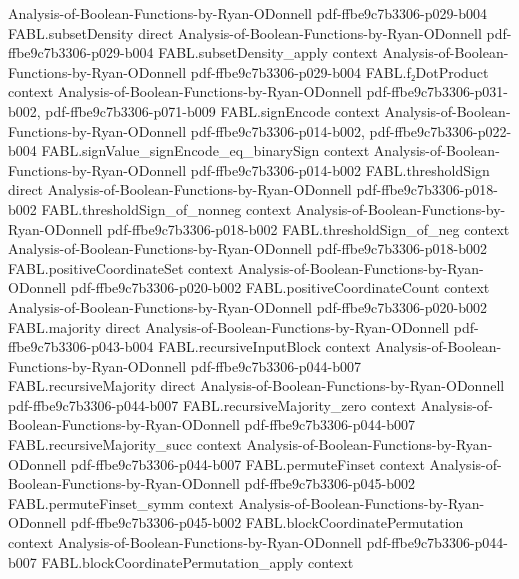 \begin{theorem}
  {Analysis-of-Boolean-Functions-by-Ryan-ODonnell}
  {pdf-ffbe9c7b3306-p029-b004}
\proofstep
  {FABL.subsetDensity}
  {direct}
  {Analysis-of-Boolean-Functions-by-Ryan-ODonnell}
  {pdf-ffbe9c7b3306-p029-b004}
\proofstep
  {FABL.subsetDensity_apply}
  {context}
  {Analysis-of-Boolean-Functions-by-Ryan-ODonnell}
  {pdf-ffbe9c7b3306-p029-b004}
\proofstep
  {FABL.f₂DotProduct}
  {context}
  {Analysis-of-Boolean-Functions-by-Ryan-ODonnell}
  {pdf-ffbe9c7b3306-p031-b002,
    pdf-ffbe9c7b3306-p071-b009}
\proofstep
  {FABL.signEncode}
  {context}
  {Analysis-of-Boolean-Functions-by-Ryan-ODonnell}
  {pdf-ffbe9c7b3306-p014-b002,
    pdf-ffbe9c7b3306-p022-b004}
\proofstep
  {FABL.signValue_signEncode_eq_binarySign}
  {context}
  {Analysis-of-Boolean-Functions-by-Ryan-ODonnell}
  {pdf-ffbe9c7b3306-p014-b002}
\proofstep
  {FABL.thresholdSign}
  {direct}
  {Analysis-of-Boolean-Functions-by-Ryan-ODonnell}
  {pdf-ffbe9c7b3306-p018-b002}
\proofstep
  {FABL.thresholdSign_of_nonneg}
  {context}
  {Analysis-of-Boolean-Functions-by-Ryan-ODonnell}
  {pdf-ffbe9c7b3306-p018-b002}
\proofstep
  {FABL.thresholdSign_of_neg}
  {context}
  {Analysis-of-Boolean-Functions-by-Ryan-ODonnell}
  {pdf-ffbe9c7b3306-p018-b002}
\proofstep
  {FABL.positiveCoordinateSet}
  {context}
  {Analysis-of-Boolean-Functions-by-Ryan-ODonnell}
  {pdf-ffbe9c7b3306-p020-b002}
\proofstep
  {FABL.positiveCoordinateCount}
  {context}
  {Analysis-of-Boolean-Functions-by-Ryan-ODonnell}
  {pdf-ffbe9c7b3306-p020-b002}
\proofstep
  {FABL.majority}
  {direct}
  {Analysis-of-Boolean-Functions-by-Ryan-ODonnell}
  {pdf-ffbe9c7b3306-p043-b004}
\proofstep
  {FABL.recursiveInputBlock}
  {context}
  {Analysis-of-Boolean-Functions-by-Ryan-ODonnell}
  {pdf-ffbe9c7b3306-p044-b007}
\proofstep
  {FABL.recursiveMajority}
  {direct}
  {Analysis-of-Boolean-Functions-by-Ryan-ODonnell}
  {pdf-ffbe9c7b3306-p044-b007}
\proofstep
  {FABL.recursiveMajority_zero}
  {context}
  {Analysis-of-Boolean-Functions-by-Ryan-ODonnell}
  {pdf-ffbe9c7b3306-p044-b007}
\proofstep
  {FABL.recursiveMajority_succ}
  {context}
  {Analysis-of-Boolean-Functions-by-Ryan-ODonnell}
  {pdf-ffbe9c7b3306-p044-b007}
\proofstep
  {FABL.permuteFinset}
  {context}
  {Analysis-of-Boolean-Functions-by-Ryan-ODonnell}
  {pdf-ffbe9c7b3306-p045-b002}
\proofstep
  {FABL.permuteFinset_symm}
  {context}
  {Analysis-of-Boolean-Functions-by-Ryan-ODonnell}
  {pdf-ffbe9c7b3306-p045-b002}
\proofstep
  {FABL.blockCoordinatePermutation}
  {context}
  {Analysis-of-Boolean-Functions-by-Ryan-ODonnell}
  {pdf-ffbe9c7b3306-p044-b007}
\proofstep
  {FABL.blockCoordinatePermutation_apply}
  {context}

\end{theorem}

